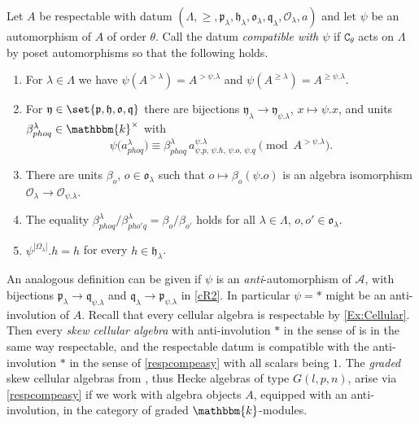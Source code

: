\documentclass[a4paper,11pt]{amsart}
\numberwithin{equation}{subsection}
\theoremstyle{definition}
\theoremstyle{theorem}
\theoremstyle{remark}
\newcommand\CA{\mathcal{A}}
\newcommand\CO{\mathcal{O}}
\newcommand\plam[1][\lambda]{\mathfrak{p}_{#1}}
\newcommand\hlam[1][\lambda]{\mathfrak{h}_{#1}}
\newcommand\qlam[1][\lambda]{\mathfrak{q}_{#1}}
\newcommand\Olam[1][\lambda]{\CO_{#1}}
\newcommand\olam[1][\lambda]{\mathfrak{o}_{#1}}
\newcommand\kk{\mathbbm{k}}
\begin{document}
\begin{Definition}\label{respcompeasy}
 Let $A$ be respectable with
datum $(\Lambda,\ge,\plam,\hlam,\olam,\qlam,\Olam,a)$ and let $\psi$ be an
automorphism of $A$ of order $\theta$. Call the datum \emph{compatible with $\psi$} if
$\mathtt{C}_\theta$ acts on $\Lambda$ by poset automorphisms so that the following holds.
\begin{enumerate}[label=\upshape(cR\arabic*), ref=\upshape(cR\arabic*)]
  \item\label{cR1} For $\lambda\in \Lambda$ we have $\psi(A^{>\lambda})=A^{>\psi.\lambda}$ and
    $\psi(A^{\ge\lambda})=A^{\ge\psi.\lambda}$.
  \item\label{cR2} For $\mathfrak y\in\set{\mathfrak p,\mathfrak h,\mathfrak o,\mathfrak q}$
    there are bijections $\mathfrak y_\lambda\to\mathfrak y_{\psi.\lambda}$,
    $x\mapsto\psi.x$, and units $\beta^{\lambda}_{phoq}\in\kk^{\times}$ with
    \[
      \psi\bigl(a^{\lambda}_{phoq}\bigr)\equiv\beta^{\lambda}_{phoq}\,
        a^{\psi.\lambda}_{\psi.p,\,\psi.h,\,\psi.o,\,\psi.q}
      \pmod{A^{>\psi.\lambda}}.
    \]
  \item\label{cR3} There are units $\beta_o$, $o\in\olam$ such that
    $o\mapsto\beta_o(\psi.o)$ is an algebra isomorphism
    $\Olam\to\Olam[\psi.\lambda]$.
 \item\label{cR4} The equality
    $\beta^{\lambda}_{phoq}/\beta^{\lambda}_{pho'q}=\beta_o/\beta_{o'}$ holds for all $\lambda\in\Lambda$,
    $o,o'\in\olam$.
  \item\label{cR5} $\psi^{|\Omega_\lambda|}.h=h$ for every $h\in\hlam$.
\end{enumerate}
\end{Definition}
\begin{Example}
An analogous definition can be given if  $\psi$ is an \emph{anti}-automorphism of $\CA$, with bijections $\plam\to\qlam[\psi.\lambda]$ and $\qlam\to\plam[\psi.\lambda]$ in \autoref{cR2}.  In particular $\psi=\ast$ might be an anti-involution  of $A$.
Recall that every cellular algebra is respectable by \autoref{Ex:Cellular}. Then every \emph{skew cellular algebra} with anti-involution $\ast$ in  the sense of \cite{MathasRostam} is in the same way respectable, and the respectable datum is compatible with the anti-involution $\ast$ in the sense of \autoref {respcompeasy} with all scalars being  $1$. The  \emph{graded} skew cellular algebras from \cite{MathasRostam}, thus Hecke algebras of type $G(l,p,n)$, arise via  \autoref {respcompeasy}  if we work with algebra objects $A$, equipped with an anti-involution, in the category of graded $\kk$-modules.
\end{Example}
\end{document}
